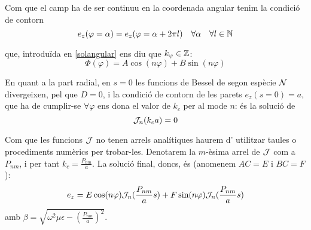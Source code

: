 Com que el camp ha de ser continuu en la coordenada angular tenim la condició de contorn
\begin{equation}
  e_z(\varphi = \alpha) = e_z ( \varphi = \alpha + 2 \pi l) \quad \forall \alpha \quad \forall l \in \mathbb N
\end{equation}

que, introduïda en \cref{solangular} ens diu que $k_{\varphi} \in \mathbb Z$:
\begin{equation}
  \Phi (\varphi ) = A \cos (n \varphi ) + B \sin (n \varphi)
\end{equation}

En quant a la part radial, en $s = 0$ les funcions de Bessel de segon espècie $\mathcal N$ divergeixen, pel que $D = 0$, i la condició de contorn de les parets $e_z(s = 0) = a$, que ha de cumplir-se $\forall \varphi$ ens dona el valor de $k_c$ per al mode $n$: és la solució de
\begin{equation}
  \mathcal J _ n (k_c a ) = 0
\end{equation}

Com que les funcions $\mathcal J$ no tenen arrels analítiques haurem d' utilitzar taules o procediments numèrics per trobar-les. Denotarem la $m$-èsima arrel de $\mathcal J$ com a $P_{nm}$, i per tant $k_c = \frac{P_{nm}}{a}$. La solució final, doncs, és (anomenem $AC = E$ i $BC = F$):
\begin{equation}
  e_z = E \cos (n \varphi ) \mathcal J _n ( \frac{P_{nm}}{a} s ) + F \sin (n \varphi ) \mathcal J_n (\frac{P_{nm}}{a}s)
\end{equation}
amb $ \beta = \sqrt{\omega ^ 2 \mu \epsilon - \left ( \frac{P_{nm}}{a} \right ) ^2}$.

